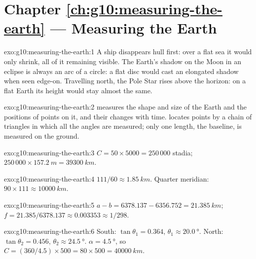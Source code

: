 \section*{Chapter \ref{ch:g10:measuring-the-earth} --- Measuring the Earth}

\begin{solution}{exo:g10:measuring-the-earth:1}
A ship disappears hull first: over a flat sea it would only shrink, all of
it remaining visible. The Earth's shadow on the Moon in an eclipse is always
an arc of a circle: a flat disc would cast an elongated shadow when seen
edge-on. Travelling north, the Pole Star rises above the horizon: on a flat
Earth its height would stay almost the same.
\end{solution}

\begin{solution}{exo:g10:measuring-the-earth:2}
 measures the shape and size of the Earth and the positions of
points on it, and their changes with time.  locates points by
a chain of triangles in which all the angles are measured; only one length,
the baseline, is measured on the ground.
\end{solution}

\begin{solution}{exo:g10:measuring-the-earth:3}
$C = 50 \times 5000 = 250\,000$ stadia; $250\,000 \times \qty{157.2}{m} =
\qty{39300}{km}$.
\end{solution}

\begin{solution}{exo:g10:measuring-the-earth:4}
$111/60 \approx \qty{1.85}{km}$. Quarter meridian: $90 \times 111 \approx
\qty{10000}{km}$.
\end{solution}

\begin{solution}{exo:g10:measuring-the-earth:5}
$a - b = 6378.137 - 6356.752 = \qty{21.385}{km}$;
$f = 21.385/6378.137 \approx 0.003353 \approx 1/298$.
\end{solution}

\begin{solution}{exo:g10:measuring-the-earth:6}
South: $\tan\theta_1 = 0.364$, $\theta_1 \approx \qty{20.0}{\degree}$. North:
$\tan\theta_2 = 0.456$, $\theta_2 \approx \qty{24.5}{\degree}$.
$\alpha = \qty{4.5}{\degree}$, so $C = (360/4.5) \times 500 = 80 \times 500 =
\qty{40000}{km}$.
\end{solution}

